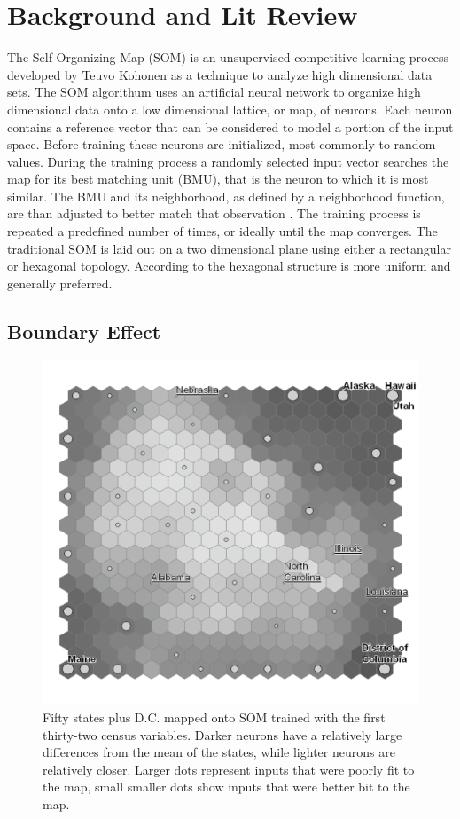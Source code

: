 \documentclass[11pt]{article}
\begin{document}
\section{Background and Lit Review}
The Self-Organizing Map (SOM) is an unsupervised competitive learning process
developed by Teuvo Kohonen as a technique to analyze high dimensional data sets.
The SOM algorithum uses an artificial neural network to organize high
dimensional data onto a low dimensional lattice, or map, of neurons.  Each
neuron contains a reference vector that can be considered to model a portion of
the input space. Before training these neurons are initialized, most commonly to
random values.  During the training process a randomly selected input vector
searches the map for its best matching unit (BMU), that is the neuron to which
it is most similar. The BMU and its neighborhood, as defined by a neighborhood
function, are than adjusted to better match that observation
\citep{Kohonen2000}.  The training process is repeated a predefined number of
times, or ideally until the map converges.  The traditional SOM is laid out on a
two dimensional plane using either a rectangular or hexagonal topology.
According to \cite{wu2006} the hexagonal structure is more uniform and
generally preferred.

\subsection{Boundary Effect}
\begin{figure}
\centering
\includegraphics[width=1\linewidth]{gridedge_grey.pdf}
\caption{Fifty states plus D.C. mapped onto SOM trained with the first
thirty-two census variables.  Darker neurons have a relatively large differences
from the mean of the states, while lighter neurons are relatively closer.
Larger dots represent inputs that were poorly fit to the map, small smaller dots
show inputs that were better bit to the map.}
\label{figure1}
\end{figure}
\end{document}
